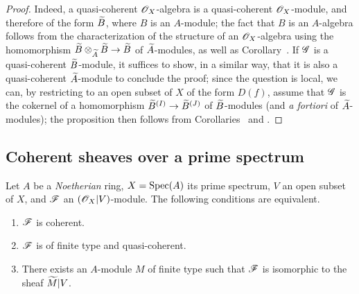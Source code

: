 \begin{proof}
\label{proof-1.1.4.3}
Indeed, a quasi-coherent $\mathscr{O}_X$-algebra is a quasi-coherent $\mathscr{O}_X$-module, and therefore of the form ${\widetilde{B}}$, where $B$ is an $A$-module;
the fact that $B$ is an $A$-algebra follows from the characterization of the structure of an $\mathscr{O}_X$-algebra using the homomorphism $\wt{B}\otimes_\wt{A}\wt{B}\to\wt{B}$ of ${\widetilde{A}}$-modules, as well as Corollary~.
If $\mathscr{G}$ is a quasi-coherent ${\widetilde{B}}$-module, it suffices to show, in a similar way, that it is also a quasi-coherent ${\widetilde{A}}$-module to conclude the proof;
since the question is local, we can, by restricting to an open subset of $X$ of the form $D(f)$, assume that $\mathscr{G}$ is the cokernel of a homomorphism $\wt{B}^{(I)}\to\wt{B}^{(J)}$ of ${\widetilde{B}}$-modules (and \emph{a fortiori} of ${\widetilde{A}}$-modules);
the proposition then follows from Corollaries~ and .
\end{proof}

\subsection{Coherent sheaves over a prime spectrum}
\label{subsection-coh-over-spec}

\begin{thm}[1.5.1]
\label{1.1.5.1}
Let $A$ be a \emph{Noetherian} ring, $X={\mathop{\mathrm{Spec}}\nolimits}(A)$ its prime spectrum, $V$ an open subset of $X$, and $\mathscr{F}$ an $(\mathscr{O}_X|V)$-module.
The following conditions are equivalent.
\begin{enumerate}[label=\emph{(\alph*)}]
  \item $\mathscr{F}$ is coherent.
  \item $\mathscr{F}$ is of finite type and quasi-coherent.
  \item There exists an $A$-module $M$ of finite type such that $\mathscr{F}$ is isomorphic to the sheaf ${\widetilde{M}}|V$.
\end{enumerate}
\end{thm}

